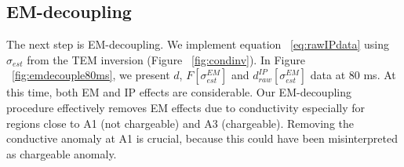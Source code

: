 \documentclass[paper]{geophysics}
\newcommand{\dip}{d^{IP}}
\begin{document}



\subsection{EM-decoupling}
The next step is EM-decoupling. We implement equation ~\ref{eq:rawIPdata} using  $\sigma_{est}$ from the TEM inversion (Figure ~\ref{fig:condinv}). In Figure ~\ref{fig:emdecouple80ms}, we present $d$, $F[\sigma^{EM}_{est}]$ and $\dip_{raw}[\sigma^{EM}_{est}]$ data at 80 ms. At this time, both EM and IP effects are considerable. Our EM-decoupling procedure effectively removes EM effects due to conductivity especially for regions close to A1 (not chargeable) and A3 (chargeable). Removing the conductive anomaly at A1 is crucial, because this could have been misinterpreted as chargeable anomaly.
\end{document}
